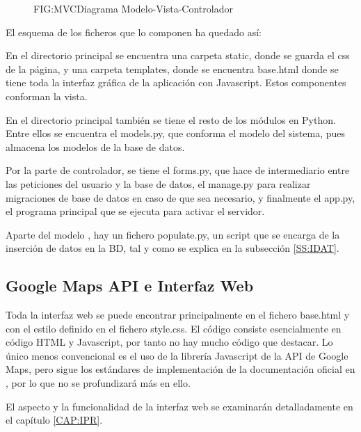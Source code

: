       \begin{figure}[Diagrama Modelo-Vista-Controlador]{FIG:MVC}{Diagrama Modelo-Vista-Controlador}
      \end{figure}
      
      El esquema de los ficheros que lo componen ha quedado así:
      
      En el directorio principal se encuentra una carpeta static, donde se guarda el css de la página, y una carpeta templates, donde se encuentra  base.html donde se tiene toda la interfaz gráfica de la aplicación con Javascript. Estos componentes conforman la vista. 
       
      En el directorio principal también se tiene el resto de los módulos en Python. 
      Entre ellos se encuentra el models.py, que conforma el modelo del sistema, pues almacena los modelos de la base de datos.
      
      Por la parte de controlador, se tiene el forms.py, que hace de intermediario entre las peticiones del usuario y la base de datos, el manage.py para realizar migraciones de base de datos en caso de que sea necesario, y finalmente el app.py, el programa principal que se ejecuta para activar el servidor.
      
      Aparte del modelo , hay un fichero populate.py, un script que se encarga de la inserción de datos en la BD, tal y como se explica en la subsección \ref{SS:IDAT}.
      
      
    \subsection{Google Maps API e Interfaz Web}
      Toda la interfaz web se puede encontrar principalmente en el fichero base.html y con el estilo definido en el fichero style.css. El código consiste esencialmente en código HTML y Javascript, por tanto no hay mucho código que destacar. Lo único menos convencional es el uso de la  librería Javascript de la API de Google Maps, pero sigue los estándares de implementación de la documentación oficial en \cite{gmaps}, por lo que no se profundizará más en ello.
      
      El aspecto y la funcionalidad de la interfaz web se examinarán detalladamente en el capítulo \ref{CAP:IPR}.
      
